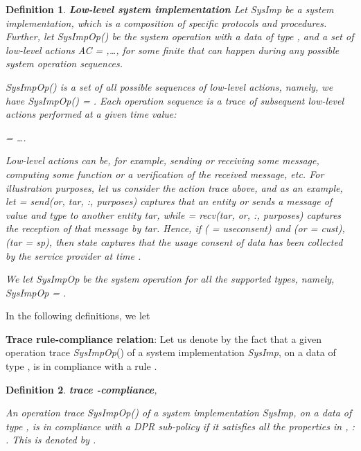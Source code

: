 \documentclass[a4paper]{article}
\newtheorem{ttd}{Definition}
\begin{document}
\begin{ttd}\label{def:sysimp}
\textbf{\emph{Low-level system implementation}} \noindent Let \textit{SysImp} be a system implementation, which is  a composition of  specific protocols and procedures. Further, let  
\textit{SysImpOp}() be the system operation with a data  of type , and a set of low-level actions \textit{AC} = ,\dots,  for some finite  that can happen during any possible system operation sequences.


\textit{SysImpOp}() is a set of all possible  sequences of low-level actions, namely, we have \textit{SysImpOp}() = . Each operation sequence is a trace of subsequent low-level actions performed at a given time value: 

\begin{center}
 =     \dots  .    
\end{center}

Low-level actions can be, for example, sending or receiving some message, computing some function or a verification of the received message, etc. For illustration purposes, let us consider the action trace  above, and as an example, let  = \textit{send}(\textit{or}, \textit{tar}, :, \textit{purposes}) captures that an entity \textit{or} sends a message of value  and type  to another entity \textit{tar}, while  = \textit{recv}(\textit{tar}, \textit{or}, :, \textit{purposes}) captures the reception of that message by \textit{tar}. Hence, if ( = useconsent) and (\textit{or} = \textit{cust}), (\textit{tar} = \textit{sp}), then state  captures  that 
the usage consent of data  has been collected by the service provider at time .  

We let \textit{SysImpOp} be the system operation for all the supported types, namely, \textit{SysImpOp} = . 
\end{ttd}


In the following definitions, we let 

\begin{center}
\noindent\fbox{\parbox{8cm}{\ \ \ \  = \{, , , , , , , , , \}
     }
}
\end{center} 

\noindent \textbf{Trace rule-compliance relation}: Let us denote by    the fact that a given operation trace  \textit{SysImpOp}() of a system implementation \textit{SysImp}, on a data of type , is in compliance with a rule   .  


\begin{ttd}\textbf{trace -compliance},   

\noindent An operation trace  \textit{SysImpOp}() of a system implementation \textit{SysImp}, on a data of type , is in compliance with a DPR sub-policy  if it satisfies all the properties in ,   :   .  This is denoted by   .  
\end{ttd} 
\end{document}
